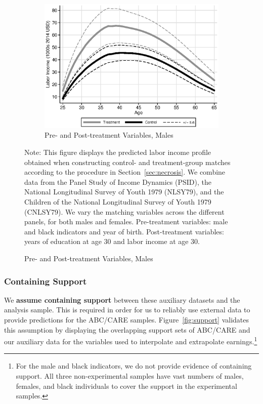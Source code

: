 \begin{figure}
\begin{subfigure}[h]{0.3\textwidth}
\end{subfigure}%
\begin{subfigure}[h]{0.3\textwidth}
	\centering
	\caption{Pre- and Post-treatment Variables, Males} 
		\includegraphics[width=\textwidth]{output/labor_25-65_pset1_mset3_male.eps}
\end{subfigure}
\footnotesize \justify
Note: This figure displays the predicted labor income profile obtained when constructing control- and treatment-group matches according to the procedure in Section~\ref{sec:necrosis}. We combine data from the Panel Study of Income Dynamics (PSID), the National Longitudinal Survey of Youth 1979 (NLSY79), and the Children of the National Longitudinal Survey of Youth 1979 (CNLSY79). We vary the matching variables across the different panels, for both males and females. Pre-treatment variables: male and black indicators and year of birth. Post-treatment variables: years of education at age 30 and labor income at age 30.
\end{figure}

\subsubsection{Containing Support}

\noindent We \textbf{assume containing support} between these auxiliary datasets and the analysis sample. This is required in order for us to reliably use external data to provide predictions for the ABC/CARE samples. Figure~\ref{fig:support} validates this assumption by displaying the overlapping support sets of ABC/CARE and our auxiliary data for the variables used to interpolate and extrapolate earnings.\footnote{For the male and black indicators, we do not provide evidence of containing support. All three non-experimental samples have vast numbers of males, females, and black individuals to cover the support in the experimental samples.}\\

